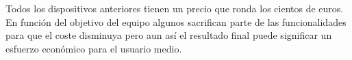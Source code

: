 
Todos los dispositivos anteriores tienen un precio que ronda los cientos de euros. En función del objetivo del equipo algunos sacrifican parte de las funcionalidades para que el coste disminuya pero aun así el resultado final puede significar un esfuerzo económico para el usuario medio.
